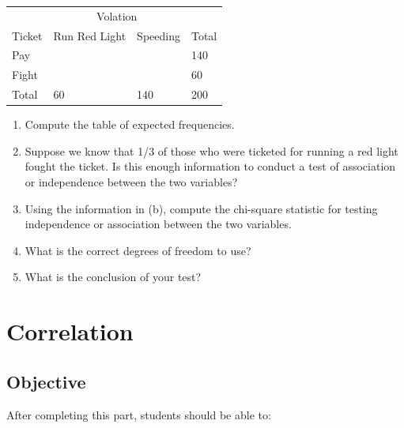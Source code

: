 \documentclass[11pt, chapterprefix=true]{scrbook}\usepackage[]{graphicx}\usepackage[]{color}
\begin{document}
\begin{exercises}
\begin{exercise}
\begin{table}[ht]
\centering
\begin{tabular}{@{} llll @{}} \hline
& \multicolumn{2}{c}{Volation} \\
Ticket & Run Red Light & Speeding & Total \\ \hline
Pay  &  &   & 140 \\
Fight   &  &  & 60  \\ \hline
Total & 60 & 140 & 200 \\ \hline
\end{tabular}
\end{table}

\begin{enumerate}
  \item Compute the table of expected frequencies.
  \item Suppose we know that 1/3 of those who were ticketed for running a red light \\ fought the ticket.  Is this enough information to conduct a test of association or independence between the two variables?
  \item Using the information in (b), compute the chi-square statistic for testing independence or association between the two variables.
  \item What is the correct degrees of freedom to use?
  \item What is the conclusion of your test?
\end{enumerate}

\end{exercise}
\begin{solution} %

\end{solution}
\end{exercises}

\onecolumn



\chapter{Correlation}
\label{chap:ch13}

\section{Objective}

After completing this part, students should be able to:
\end{document}
